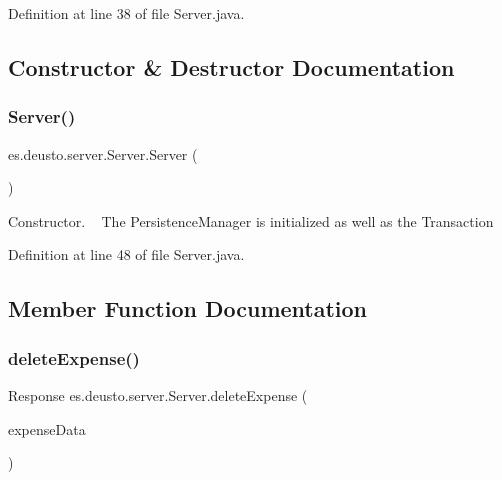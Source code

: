 Definition at line 38 of file Server.\+java.



\subsection{Constructor \& Destructor Documentation}
\mbox{\label{classes_1_1deusto_1_1server_1_1_server_a84f78162a65dd737f224eb2f94c43023}} 
\subsubsection{\texorpdfstring{Server()}{Server()}}
{\footnotesize\ttfamily es.\+deusto.\+server.\+Server.\+Server (\begin{DoxyParamCaption}{ }\end{DoxyParamCaption})}

Constructor. ~\newline
The Persistence\+Manager is initialized as well as the Transaction 

Definition at line 48 of file Server.\+java.



\subsection{Member Function Documentation}
\mbox{\label{classes_1_1deusto_1_1server_1_1_server_aa9fc28b2ce1a31d8176a23768e48f173}} 
\subsubsection{\texorpdfstring{delete\+Expense()}{deleteExpense()}}
{\footnotesize\ttfamily Response es.\+deusto.\+server.\+Server.\+delete\+Expense (\begin{DoxyParamCaption}\item[{\hyperlink{classes_1_1deusto_1_1serialization_1_1_expense_data}{Expense\+Data}}]{expense\+Data }\end{DoxyParamCaption})}



